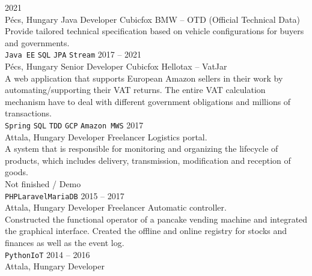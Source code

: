 \documentclass[9pt]{developercv} %
\begin{document}


\begin{entrylist}
    \entry
        {2021 \\ Pécs, Hungary}
        {Java Developer}
        {Cubicfox}
        {BMW -- OTD (Official Technical Data)\\
            Provide tailored technical specification based on vehicle configurations for buyers and governments. \\
            \texttt{Java EE}
            \slashsep\texttt{SQL}
            \slashsep\texttt{JPA}
            \slashsep\texttt{Stream}}
    \entry
        {2017 -- 2021 \\ Pécs, Hungary}
        {Senior Developer}
        {Cubicfox}
        {Hellotax -- VatJar\\
            A web application that supports European Amazon sellers in their work by automating/supporting their VAT returns.
            The entire VAT calculation mechanism have to deal with different government obligations and millions of transactions. \\
            \texttt{Spring}
            \slashsep\texttt{SQL}
            \slashsep\texttt{TDD}
            \slashsep\texttt{GCP}
            \slashsep\texttt{Amazon MWS}}
	\entry
		{2017 \\ Attala, Hungary}
		{Developer}
		{Freelancer}
		{Logistics portal. \\
			A system that is responsible for monitoring and organizing the lifecycle of products, which includes delivery,
			transmission, modification and reception of goods.\\
			Not finished / Demo
			\\ \texttt{PHP}\slashsep\texttt{Laravel}\slashsep\texttt{MariaDB}}
	\entry
		{2015 -- 2017 \\ Attala, Hungary}
		{Developer}
		{Freelancer}
		{Automatic controller. \\
			Constructed the functional operator of a pancake vending machine and integrated the graphical interface. Created the
			offline and online registry for stocks and finances as well as the event log.
			\\ \texttt{Python}\slashsep\texttt{IoT}}
	\entry
		{2014 -- 2016 \\ Attala, Hungary}
		{Developer}

\end{entrylist}
\end{document}
